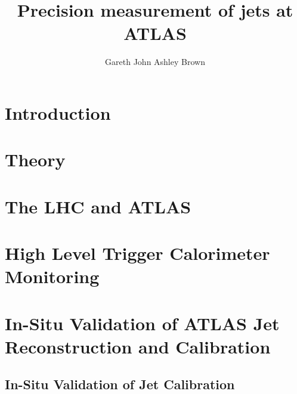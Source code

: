 \documentclass[12pt,PhD]{Thesis}
\begin{document}
\title{Precision measurement of jets at ATLAS}
    \author{Gareth John Ashley Brown}

\beforeabstract
{}
    
\afterabstract
\afterpreface

\chapter{Introduction}


\chapter{Theory}
\label{chp:Theory}








\chapter{The LHC and ATLAS}
\label{chp:LHC_ATLAS}








 
 

\chapter{High Level Trigger Calorimeter Monitoring}
\label{chp:HLTCalo}


\chapter{In-Situ Validation of ATLAS Jet Reconstruction and Calibration}
\label{chp:JetPerf}

\section{In-Situ Validation of Jet Calibration}



\end{document}
